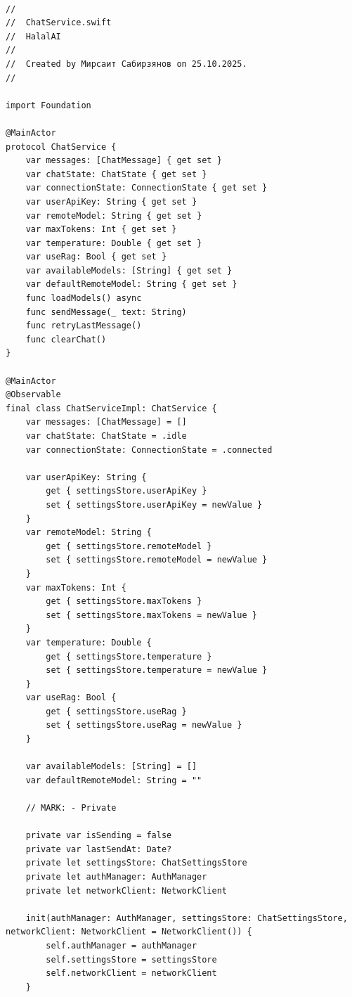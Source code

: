 \begin{lstlisting}[basicstyle=\tiny\ttfamily,breaklines=true]

//
//  ChatService.swift
//  HalalAI
//
//  Created by Мирсаит Сабирзянов on 25.10.2025.
//

import Foundation

@MainActor
protocol ChatService {
    var messages: [ChatMessage] { get set }
    var chatState: ChatState { get set }
    var connectionState: ConnectionState { get set }
    var userApiKey: String { get set }
    var remoteModel: String { get set }
    var maxTokens: Int { get set }
    var temperature: Double { get set }
    var useRag: Bool { get set }
    var availableModels: [String] { get set }
    var defaultRemoteModel: String { get set }
    func loadModels() async
    func sendMessage(_ text: String)
    func retryLastMessage()
    func clearChat()
}

@MainActor
@Observable
final class ChatServiceImpl: ChatService {
    var messages: [ChatMessage] = []
    var chatState: ChatState = .idle
    var connectionState: ConnectionState = .connected

    var userApiKey: String {
        get { settingsStore.userApiKey }
        set { settingsStore.userApiKey = newValue }
    }
    var remoteModel: String {
        get { settingsStore.remoteModel }
        set { settingsStore.remoteModel = newValue }
    }
    var maxTokens: Int {
        get { settingsStore.maxTokens }
        set { settingsStore.maxTokens = newValue }
    }
    var temperature: Double {
        get { settingsStore.temperature }
        set { settingsStore.temperature = newValue }
    }
    var useRag: Bool {
        get { settingsStore.useRag }
        set { settingsStore.useRag = newValue }
    }

    var availableModels: [String] = []
    var defaultRemoteModel: String = ""

    // MARK: - Private

    private var isSending = false
    private var lastSendAt: Date?
    private let settingsStore: ChatSettingsStore
    private let authManager: AuthManager
    private let networkClient: NetworkClient

    init(authManager: AuthManager, settingsStore: ChatSettingsStore, networkClient: NetworkClient = NetworkClient()) {
        self.authManager = authManager
        self.settingsStore = settingsStore
        self.networkClient = networkClient
    }


\end{lstlisting}
